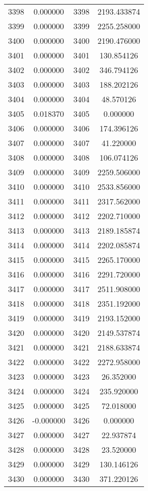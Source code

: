 \documentclass[12pt]{article}
\begin{document}
\begin{longtable}{@{}cccc@{}}
3398 & 0.000000 & 3398 & 2193.433874 \\
3399 & 0.000000 & 3399 & 2255.258000 \\
3400 & 0.000000 & 3400 & 2190.476000 \\
3401 & 0.000000 & 3401 & 130.854126 \\
3402 & 0.000000 & 3402 & 346.794126 \\
3403 & 0.000000 & 3403 & 188.202126 \\
3404 & 0.000000 & 3404 & 48.570126 \\
3405 & 0.018370 & 3405 & 0.000000 \\
3406 & 0.000000 & 3406 & 174.396126 \\
3407 & 0.000000 & 3407 & 41.220000 \\
3408 & 0.000000 & 3408 & 106.074126 \\
3409 & 0.000000 & 3409 & 2259.506000 \\
3410 & 0.000000 & 3410 & 2533.856000 \\
3411 & 0.000000 & 3411 & 2317.562000 \\
3412 & 0.000000 & 3412 & 2202.710000 \\
3413 & 0.000000 & 3413 & 2189.185874 \\
3414 & 0.000000 & 3414 & 2202.085874 \\
3415 & 0.000000 & 3415 & 2265.170000 \\
3416 & 0.000000 & 3416 & 2291.720000 \\
3417 & 0.000000 & 3417 & 2511.908000 \\
3418 & 0.000000 & 3418 & 2351.192000 \\
3419 & 0.000000 & 3419 & 2193.152000 \\
3420 & 0.000000 & 3420 & 2149.537874 \\
3421 & 0.000000 & 3421 & 2188.633874 \\
3422 & 0.000000 & 3422 & 2272.958000 \\
3423 & 0.000000 & 3423 & 26.352000 \\
3424 & 0.000000 & 3424 & 235.920000 \\
3425 & 0.000000 & 3425 & 72.018000 \\
3426 & -0.000000 & 3426 & 0.000000 \\
3427 & 0.000000 & 3427 & 22.937874 \\
3428 & 0.000000 & 3428 & 23.520000 \\
3429 & 0.000000 & 3429 & 130.146126 \\
3430 & 0.000000 & 3430 & 371.220126 \\

\end{longtable}
\end{document}
